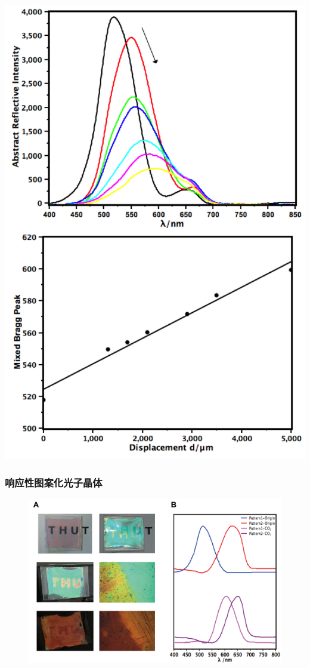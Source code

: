 \documentclass{beamer}
\begin{document}
\begin{frame}
\begin{minipage}{0.48\textwidth}
    \includegraphics[width=0.85\linewidth]{figures/distance-2D.png}
  \end{minipage}
\end{frame}


\begin{frame}
  \frametitle{响应性图案化光子晶体}
  \begin{figure}
  \centering
  \includegraphics[width=0.95\linewidth]{figures/pattern-dynamic.png}
  \end{figure}
\end{frame}
\end{document}
